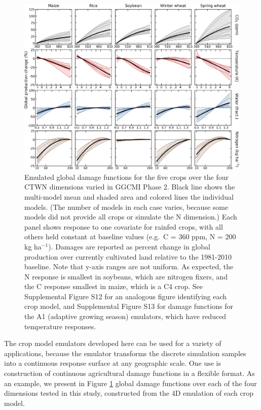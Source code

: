 \documentclass[gmdd]{copernicus} %
\begin{document}
\begin{figure}[h!]
    \centering
    \includegraphics[width = 16.3cm]{figures/em_CTWN_all_crops.png}
    \caption{
    Emulated global damage functions for the five crops over the four CTWN dimensions varied in GGCMI Phase 2.
    Black line shows the multi-model mean and shaded area and colored lines the individual models. (The number of models in each case varies, because some models did not provide all crops or simulate the N dimension.) 
    Each panel shows response to one covariate for rainfed crops, with all others held constant at baseline values (e.g.\ C = 360 ppm, N = 200 kg ha$^{-1}$). 
    Damages are reported as percent change in global production over currently cultivated land relative to the 1981-2010 baseline. Note that y-axis ranges are not uniform.
    As expected, the N response is smallest in soybeans, which are nitrogen fixers, and the C response smallest in maize, which is a C4 crop.
    See Supplemental Figure S12 for an analogous figure identifying each crop model, and Supplemental Figure S13 for damage functions for the A1 (adaptive growing season) emulators, which have reduced temperature responses.
    }
    \label{fig:all_dims}
\end{figure}

The crop model emulators developed here can be used for a variety of applications, because the emulator transforms the discrete simulation samples into a continuous response surface at any geographic scale. One use is construction of continuous agricultural damage functions in a flexible format. 
As an example, we present in  Figure \ref{fig:all_dims} global damage functions over each of the four dimensions tested in this study, constructed from the 4D emulation of each crop model.
\end{document}
